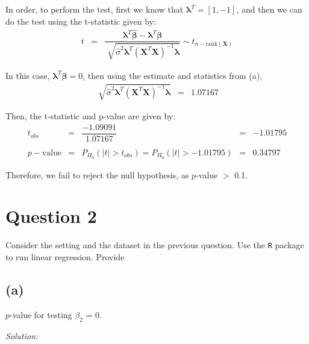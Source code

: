 \documentclass[a4paper, 11pt]{article}
\begin{document}
In order, to perform the test, first we know that $\boldsymbol{\lambda}^T = [1,-1]$, and then we can do the test using the t-statistic given by:
\begin{equation*}
\begin{array}{lclllll}
t & = & \dfrac{ \boldsymbol{\lambda}^T\boldsymbol{\hat{\beta}} -  \boldsymbol{\lambda}^T\boldsymbol{\beta}}{\displaystyle\sqrt[]{\hat{\sigma}^2 \boldsymbol{\lambda}^T (\textbf{X}^T \textbf{X})^{-1} \boldsymbol{\lambda}}} \sim t_{n-\mbox{rank}(\textbf{X})}
\end{array}
\end{equation*}

In this case, $\boldsymbol{\lambda}^T\boldsymbol{\beta} = 0$, then using the estimate and statistics from (a),
\begin{equation*}
\begin{array}{lclllll}
\displaystyle\sqrt[]{\hat{\sigma}^2 \boldsymbol{\lambda}^T (\textbf{X}^T \textbf{X})^{-1} \boldsymbol{\lambda}} & = & 1.07167
\end{array}
\end{equation*}

Then, the t-statistic and p-value are given by:
\begin{equation*}
\begin{array}{lclllll}
t_{obs} & = & \dfrac{-1.09091}{ 1.07167}&  = & -1.01795 \\\\

p-\mbox{value} & = & P_{H_0}(|t|>t_{obs}) = P_{H_0}(|t|>-1.01795) & = & 0.34797
\end{array}
\end{equation*}

Therefore, we fail to reject the null hypothesis, as $p$-value $>$ 0.1.

\section*{Question 2}

Consider the setting and the dataset in the previous question. Use the \texttt{R} package to
run linear regression. Provide

\subsection*{(a)} $p$-value for testing $\beta_2$ = 0. 

\noindent
\textit{Solution:}\\
\end{document}
